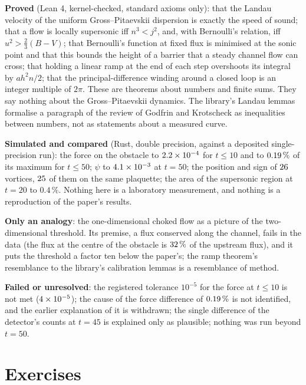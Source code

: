\begin{honestbox}
\textbf{Proved} (Lean 4, kernel-checked, standard axioms only): that the Landau velocity of the uniform Gross--Pitaevskii dispersion is exactly the speed of sound; that a flow is locally supersonic iff $n^3<j^2$, and, with Bernoulli's relation, iff $u^2>\tfrac23(B-V)$; that Bernoulli's function at fixed flux is minimised at the sonic point and that this bounds the height of a barrier that a steady channel flow can cross; that holding a linear ramp at the end of each step overshoots its integral by $ah^2n/2$; that the principal-difference winding around a closed loop is an integer multiple of $2\pi$. These are theorems about numbers and finite sums. They say nothing about the Gross--Pitaevskii dynamics. The library's Landau lemmas formalise a paragraph of the review of Godfrin and Krotscheck as inequalities between numbers, not as statements about a measured curve.\par
\textbf{Simulated and compared} (Rust, double precision, against a deposited single-precision run): the force on the obstacle to $2.2\times10^{-4}$ for $t\le10$ and to $0.19\,\%$ of its maximum for $t\le50$; $\psi$ to $4.1\times10^{-3}$ at $t=50$; the position and sign of $26$ vortices, $25$ of them on the same plaquette; the area of the supersonic region at $t=20$ to $0.4\,\%$. Nothing here is a laboratory measurement, and nothing is a reproduction of the paper's results.\par
\textbf{Only an analogy}: the one-dimensional choked flow as a picture of the two-dimensional threshold. Its premise, a flux conserved along the channel, fails in the data (the flux at the centre of the obstacle is $32\,\%$ of the upstream flux), and it puts the threshold a factor ten below the paper's; the ramp theorem's resemblance to the library's calibration lemmas is a resemblance of method.\par
\textbf{Failed or unresolved}: the registered tolerance $10^{-5}$ for the force at $t\le10$ is not met ($4\times10^{-5}$); the cause of the force difference of $0.19\,\%$ is not identified, and the earlier explanation of it is withdrawn; the single difference of the detector's counts at $t=45$ is explained only as plausible; nothing was run beyond $t=50$.
\end{honestbox}

\section{Exercises}\label{ch09:exercises}

